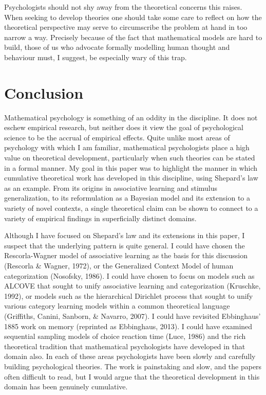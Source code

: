 \documentclass[
  english,
  doc]{apa6}
\begin{document}
\noindent
Psychologists should not shy away from the theoretical concerns this raises. When seeking to develop theories one should take some care to reflect on how the theoretical perspective may serve to circumscribe the problem at hand in too narrow a way. Precisely because of the fact that mathematical models are hard to build, those of us who advocate formally modelling human thought and behaviour must, I suggest, be especially wary of this trap.

\hypertarget{conclusion}{%
\section{Conclusion}\label{conclusion}}

\noindent
Mathematical psychology is something of an oddity in the discipline. It does not eschew empirical research, but neither does it view the goal of psychological science to be the accrual of empirical effects. Quite unlike most areas of psychology with which I am familiar, mathematical psychologists place a high value on theoretical development, particularly when such theories can be stated in a formal manner. My goal in this paper was to highlight the manner in which cumulative theoretical work has developed in this discipline, using Shepard's law as an example. From its origins in associative learning and stimulus generalization, to its reformulation as a Bayesian model and its extension to a variety of novel contexts, a single theoretical claim can be shown to connect to a variety of empirical findings in superficially distinct domains.

Although I have focused on Shepard's law and its extensions in this paper, I suspect that the underlying pattern is quite general. I could have chosen the Rescorla-Wagner model of associative learning as the basis for this discussion (Rescorla \& Wagner, 1972), or the Generalized Context Model of human categorization (Nosofsky, 1986). I could have chosen to focus on models such as ALCOVE that sought to unify associative learning and categorization (Kruschke, 1992), or models such as the hierarchical Dirichlet process that sought to unify various category learning models within a common theoretical language (Griffiths, Canini, Sanborn, \& Navarro, 2007). I could have revisited Ebbinghaus' 1885 work on memory (reprinted as Ebbinghaus, 2013). I could have examined sequential sampling models of choice reaction time (Luce, 1986) and the rich theoretical tradition that mathematical psychologists have developed in that domain also. In each of these areas psychologists have been slowly and carefully building psychological theories. The work is painstaking and slow, and the papers often difficult to read, but I would argue that the theoretical development in this domain has been genuinely cumulative.
\end{document}
